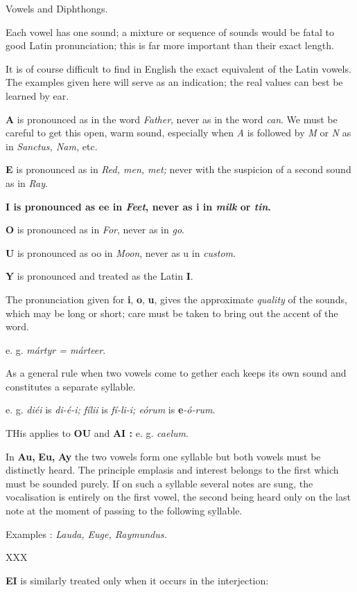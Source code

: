 {{{Vowels and Diphthongs.

Each vowel has one sound; a mixture or sequence of sounds would be fatal to good Latin pronunciation; this is far more important than their exact length.

It is of course difficult to find in English the exact equivalent of the Latin vowels. The examples given here will serve as an indication; the real values can best be learned by ear.

{\bf A} is pronounced as in the word {\it Father}, never as in the word {\it can}. We must be careful to get this open, warm sound, especially when {\it A} is followed by {\it M} or {\it N} as in {\it Sanctus, Nam,} etc.

{\bf E} is pronounced as in {\it Red, men, met;} never with the suspicion of a second sound as in {\it Ray}.

{\bf I is pronounced as ee in {\it Feet}, never as i in {\it milk} or {\it tin}.

{\bf O} is pronounced as in {\it For}, never as in {\it go}.

{\bf U} is pronounced as oo in {\it Moon}, never as u in {\it custom}.

{\bf Y} is pronounced and treated as the Latin {\bf I}.

The pronunciation given for {\bf i}, {\bf o}, {\bf u}, gives the approximate {\it quality} of the sounds, which may be long or short; care must be taken to bring out the accent of the word.

e. g. {\it mártyr = márteer}.

As a general rule when two vowels come to gether each keeps its own sound and constitutes a separate syllable.

e. g. {\it diéi} is {\it di-é-i; fílii} is {\it fí-li-i; eórum} is {\bf e}{\it -ó-rum}.

THis applies to {\bf OU} and {\bf AI :}
e. g. {\it caelum}.

In {\bf Au,} {\bf Eu,} {\bf Ay} the two vowels form one syllable but both vowels must be distinctly heard. The principle emplasis and interest belongs to the first which must be sounded purely. If on such a syllable several notes are sung, the vocalisation is entirely on the first vowel, the second being heard only on the last note at the moment of passing to the following syllable.

Examples : {\it Lauda, Euge, Raymundus.}

XXX

{\bf EI} is similarly treated only when it occurs in the interjection:

}}}}
